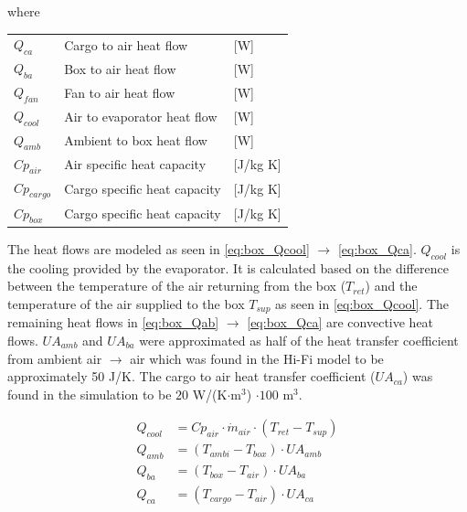 where
\begin{center}
	\begin{tabular}{l p{8cm} l}
		$Q_{ca}$     & Cargo to air heat flow       & [\si{W}]                \\
		$Q_{ba}$     & Box to air heat flow         & [\si{W}]                \\
		$Q_{fan}$    & Fan to air heat flow         & [\si{W}]                \\
		$Q_{cool}$   & Air to evaporator heat flow  & [\si{W}]                \\
		$Q_{amb}$    & Ambient to box heat flow     & [\si{W}]                \\
		$Cp_{air}$   & Air specific heat capacity   & [\si{J}/\si{kg} \si{K}] \\
		$Cp_{cargo}$ & Cargo specific heat capacity & [\si{J}/\si{kg} \si{K}] \\
		$Cp_{box}$   & Cargo specific heat capacity & [\si{J}/\si{kg} \si{K}]
	\end{tabular}
\end{center}


The heat flows are modeled as seen in \cref{eq:box_Qcool} $\rightarrow$ \cref{eq:box_Qca}. $Q_{cool}$ is the cooling provided by the evaporator. It is calculated based on the difference between the temperature of the air returning from the box ($T_{ret}$) and the temperature of the air supplied to the box $T_{sup}$ as seen in \cref{eq:box_Qcool}. The remaining heat flows in \cref{eq:box_Qab} $\rightarrow$ \cref{eq:box_Qca} are convective heat flows. $U A_{amb}$ and $U A_{ba}$ were approximated as half of the heat transfer coefficient from ambient air $\rightarrow$ air which was found in the Hi-Fi model to be approximately 50 \si{J}/\si{K}. The cargo to air heat transfer coefficient ($U A_{ca}$) was found in the simulation to be $20$ \si{W}/(\si{K}$\cdot$\si{m}$^3$) $\cdot 100$ \si{m}$^3$.


\begin{align}
	Q_{cool}   & = Cp_{air} \cdot \dot{m}_{air} \cdot (T_{ret} - T_{sup})	\label{eq:box_Qcool} \\
	Q_{amb}    & = (T_{ambi} - T_{box}) \cdot U A_{amb}						\label{eq:box_Qab}   \\
	Q_{ba}     & = (T_{box} - T_{air}) \cdot U A_{ba}						\label{eq:box_Qba}   \\
	Q_{ca}     & = (T_{cargo} - T_{air}) \cdot U A_{ca}                  	\label{eq:box_Qca}
\end{align}

